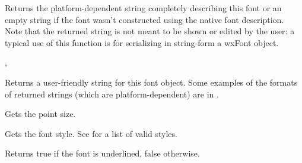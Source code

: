 Returns the platform-dependent string completely describing this font or an
empty string if the font wasn't constructed using the native font description.
Note that the returned string is not meant to be shown or edited by the user: a typical
use of this function is for serializing in string-form a wxFont object.


,


\label{wxfontgetnativefontinfouserdesc}


Returns a user-friendly string for this font object. Some examples of the formats of returned strings (which are platform-dependent) are in .




\label{wxfontgetpointsize}


Gets the point size.




\label{wxfontgetstyle}


Gets the font style. See  for a list of valid
styles.




\label{wxfontgetunderlined}


Returns true if the font is underlined, false otherwise.




\label{wxfontgetweight}

